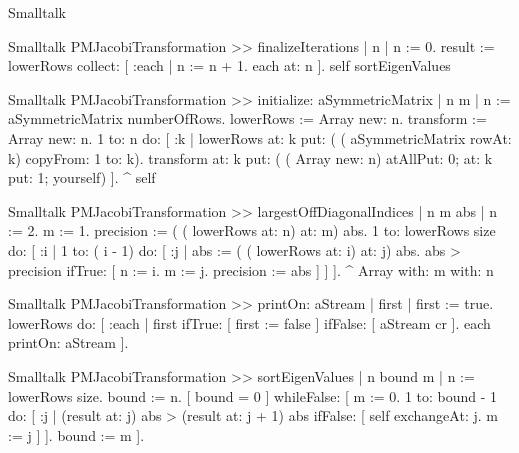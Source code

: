 \begin{displaycode}{Smalltalk}
\begin{displaycode}{Smalltalk}
PMJacobiTransformation >> finalizeIterations
    | n |
    n := 0.
    result := lowerRows collect: 
                    [ :each | 
                    n := n + 1.
                    each at: n ].
    self sortEigenValues
\end{displaycode}

\begin{displaycode}{Smalltalk}
PMJacobiTransformation >> initialize: aSymmetricMatrix
    | n m |
    n := aSymmetricMatrix numberOfRows.
    lowerRows := Array new: n.
    transform := Array new: n.
    1 to: n do:
        [ :k |
          lowerRows at: k put: ( ( aSymmetricMatrix rowAt: k) 
                                                   copyFrom: 1 to: k).
          transform at: k put: ( ( Array new: n) atAllPut: 0; at: k 
                                                    put: 1; yourself) ].
    ^ self
\end{displaycode}

\begin{displaycode}{Smalltalk}
PMJacobiTransformation >> largestOffDiagonalIndices
    | n m abs |
    n := 2.
    m := 1.
    precision := ( ( lowerRows at: n) at: m) abs.
    1 to: lowerRows size do:
        [ :i |
          1 to: ( i - 1) do:
            [ :j |
              abs := ( ( lowerRows at: i) at: j) abs.
              abs > precision
                ifTrue: [ n := i.
                          m := j.
                          precision := abs ] ] ].
    ^ Array with: m with: n
\end{displaycode}

\begin{displaycode}{Smalltalk}
PMJacobiTransformation >> printOn: aStream
    | first |
    first := true.
    lowerRows do: 
        [ :each |
          first ifTrue: [ first := false ]
                 ifFalse: [ aStream cr ].
          each printOn: aStream ].
\end{displaycode}

\begin{displaycode}{Smalltalk}
PMJacobiTransformation >> sortEigenValues
    | n bound m |
    n := lowerRows size.
    bound := n.
    [ bound = 0 ]
        whileFalse: [ m := 0.
                      1 to: bound - 1 do:
                        [ :j |
                          (result at: j) abs > (result at: j + 1) abs
                            ifFalse: [ self exchangeAt: j.
                                      m := j ] ].
                        bound := m ].
\end{displaycode}


\end{displaycode}
